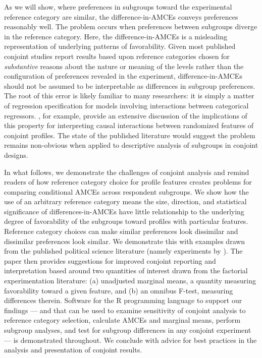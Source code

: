\documentclass[a4paper,12pt]{article}\usepackage[]{graphicx}\usepackage[]{color}
\begin{document}
As we will show, where preferences in subgroups toward the experimental reference category are similar, the difference-in-AMCEs conveys preferences reasonably well. The problem occurs when preferences between subgroups diverge in the reference category. Here, the difference-in-AMCEs is a misleading representation of underlying patterns of favorability. Given most published conjoint studies report results based upon reference categories chosen for \textit{substantive} reasons about the nature or meaning of the levels rather than the configuration of preferences revealed in the experiment, difference-in-AMCEs should not be assumed to be interpretable as differences in subgroup preferences. The root of this error is likely familiar to many researchers: it is simply a matter of regression specification for models involving interactions between categorical regressors. \citet{EgamiImai2018}, for example, provide an extensive discussion of the implications of this property for interpreting causal interactions between randomized features of conjoint profiles. The state of the published literature would suggest the problem remains non-obvious when applied to descriptive analysis of subgroups in conjoint designs.

In what follows, we demonstrate the challenges of conjoint analysis and remind readers of how reference category choice for profile features creates problems for comparing conditional AMCEs across respondent subgroups. We show how the use of an arbitrary reference category means the size, direction, and statistical significance of differences-in-AMCEs have little relationship to the underlying degree of favorability of the subgroups toward profiles with particular features. Reference category choices can make similar preferences look dissimilar and dissimilar preferences look similar. We demonstrate this with examples drawn from the published political science literature (namely experiments by \citealt{HainmuellerHopkinsYamamoto2014, BechtelScheve2013, TeeleKallaRosenbluth2018}). The paper then provides suggestions for improved conjoint reporting and interpretation based around two quantities of interest drawn from the factorial experimentation literature: (a) unadjusted marginal means, a quantity measuring favorability toward a given feature, and (b) an omnibus F-test, measuring differences therein. Software for the R programming language to support our findings --- and that can be used to examine sensitivity of conjoint analysis to reference category selection, calculate AMCEs and marginal means, perform subgroup analyses, and test for subgroup differences in any conjoint experiment --- is demonstrated throughout. We conclude with advice for best practices in the analysis and presentation of conjoint results.
\end{document}
